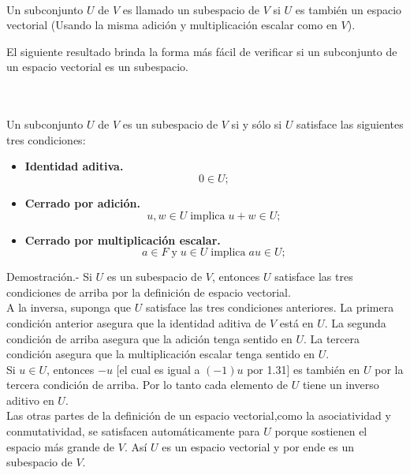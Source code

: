 
    \begin{mydef}[Subespacio]\;\\
	Un subconjunto $U$ de $V$ es llamado un subespacio de $V$ si $U$ es también un espacio vectorial (Usando la misma adición y multiplicación escalar como en $V$).
    \end{mydef}
\vspace{.5cm}

El siguiente resultado brinda la forma más fácil de verificar si un subconjunto de un espacio vectorial es un subespacio.\\

\setcounter{myteo}{33}
\begin{myteo}\;\\\\
    Un subconjunto $U$ de $V$ es un subespacio de $V$ si y sólo si $U$ satisface las siguientes tres condiciones:\\
    \begin{itemize}
	\item \textbf{Identidad aditiva.} $$0\in U;$$
	\item \textbf{Cerrado por adición.}$$u,w\in U\; \mbox{implica}\; u+w\in U;$$
	\item \textbf{Cerrado por multiplicación escalar.}
	    $$a\in F \; \mbox{y}\; u\in U\; \mbox{implica}\; au\in U;$$
    \end{itemize}
    \vspace{.4cm}
	Demostración.-\; Si $U$ es un subespacio de $V$, entonces $U$ satisface las tres condiciones de arriba por la definición de espacio vectorial.\\
	A la inversa, suponga que $U$ satisface las tres condiciones anteriores. La primera condición anterior asegura que la identidad aditiva de $V$ está en $U$. La segunda condición de arriba asegura que la adición tenga sentido en $U$. La tercera condición asegura que la multiplicación escalar tenga sentido en $U$.\\
	Si $u\in U$, entonces $-u$ [el cual es igual a $(-1)u$ por 1.31] es también en $U$ por la tercera condición de arriba. Por lo tanto cada elemento de $U$ tiene un inverso aditivo en $U$.\\
	Las otras partes de la definición de un espacio vectorial,como la asociatividad y conmutatividad, se satisfacen automáticamente para $U$ porque sostienen el espacio más grande de $V$. Así $U$ es un espacio vectorial y por ende es un subespacio de $V$.
\end{myteo}
\vspace{.5cm}

